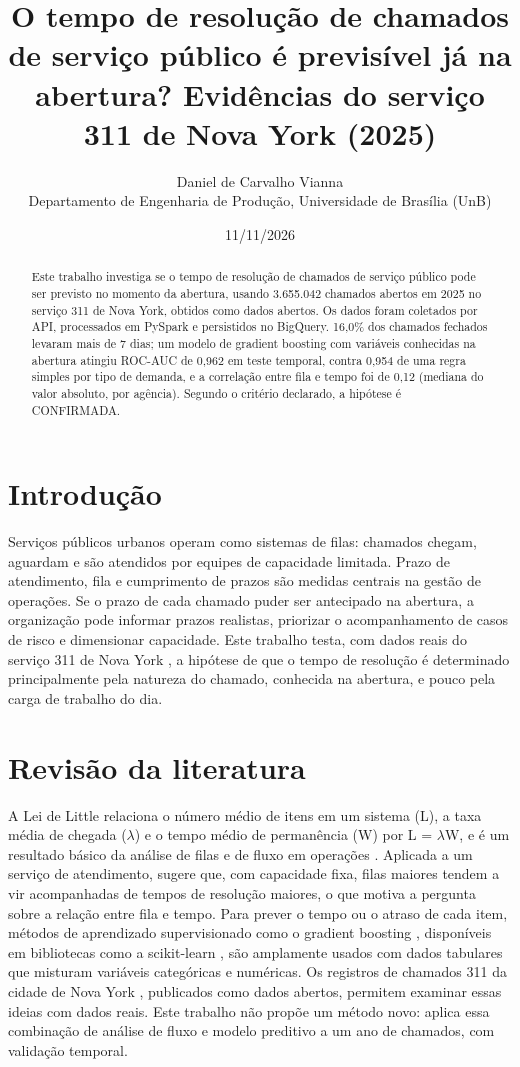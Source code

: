 \documentclass[11pt,a4paper]{article}
\title{O tempo de resolução de chamados de serviço público é previsível já na abertura? Evidências do serviço 311 de Nova York (2025)}
\author{Daniel de Carvalho Vianna\\ Departamento de Engenharia de Produção, Universidade de Brasília (UnB)}
\date{11/11/2026}
\begin{document}
\maketitle

\begin{abstract}
Este trabalho investiga se o tempo de resolução de chamados de serviço público pode ser previsto no momento da abertura, usando 3.655.042 chamados abertos em 2025 no serviço 311 de Nova York, obtidos como dados abertos. Os dados foram coletados por API, processados em PySpark e persistidos no BigQuery. 16,0\% dos chamados fechados levaram mais de 7 dias; um modelo de gradient boosting com variáveis conhecidas na abertura atingiu ROC-AUC de 0,962 em teste temporal, contra 0,954 de uma regra simples por tipo de demanda, e a correlação entre fila e tempo foi de 0,12 (mediana do valor absoluto, por agência). Segundo o critério declarado, a hipótese é CONFIRMADA.
\end{abstract}

\section{Introdução}
Serviços públicos urbanos operam como sistemas de filas: chamados chegam, aguardam e são atendidos por equipes de capacidade limitada. Prazo de atendimento, fila e cumprimento de prazos são medidas centrais na gestão de operações. Se o prazo de cada chamado puder ser antecipado na abertura, a organização pode informar prazos realistas, priorizar o acompanhamento de casos de risco e dimensionar capacidade. Este trabalho testa, com dados reais do serviço 311 de Nova York \cite{nyc311}, a hipótese de que o tempo de resolução é determinado principalmente pela natureza do chamado, conhecida na abertura, e pouco pela carga de trabalho do dia.

\section{Revisão da literatura}
A Lei de Little \cite{little} relaciona o número médio de itens em um sistema (L), a taxa média de chegada ($\lambda$) e o tempo médio de permanência (W) por L = $\lambda$W, e é um resultado básico da análise de filas e de fluxo em operações \cite{hopp}. Aplicada a um serviço de atendimento, sugere que, com capacidade fixa, filas maiores tendem a vir acompanhadas de tempos de resolução maiores, o que motiva a pergunta sobre a relação entre fila e tempo. Para prever o tempo ou o atraso de cada item, métodos de aprendizado supervisionado como o gradient boosting \cite{friedman}, disponíveis em bibliotecas como a scikit-learn \cite{sklearn}, são amplamente usados com dados tabulares que misturam variáveis categóricas e numéricas. Os registros de chamados 311 da cidade de Nova York \cite{nyc311}, publicados como dados abertos, permitem examinar essas ideias com dados reais. Este trabalho não propõe um método novo: aplica essa combinação de análise de fluxo e modelo preditivo a um ano de chamados, com validação temporal.
\end{document}
